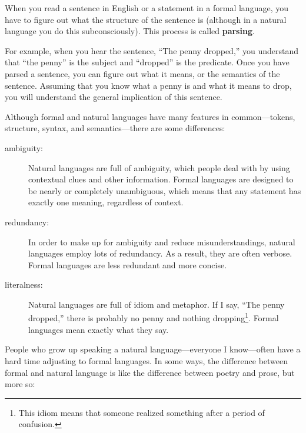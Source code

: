 \documentclass[10pt]{book}
\begin{document}
When you read a sentence in English or a statement in a formal language, you have to figure out what the structure of the sentence is (although in a natural language you do this subconsciously).  This process is called {\bf parsing}.


For example, when you hear the sentence, ``The penny dropped,'' you understand that ``the penny'' is the subject and ``dropped'' is the predicate.  Once you have parsed a sentence, you can figure out what it means, or the semantics of the sentence.  Assuming that you know what a penny is and what it means to drop, you will understand the general implication of this sentence.

Although formal and natural languages have many features in common---tokens, structure, syntax, and semantics---there are some differences:


\begin{description}

\item[ambiguity:] Natural languages are full of ambiguity, which people deal with by using contextual clues and other information. Formal languages are designed to be nearly or completely unambiguous, which means that any statement has exactly one meaning, regardless of context.

\item[redundancy:] In order to make up for ambiguity and reduce misunderstandings, natural languages employ lots of redundancy.  As a result, they are often verbose.  Formal languages are less redundant and more concise.

\item[literalness:] Natural languages are full of idiom and metaphor. If I say, ``The penny dropped,'' there is probably no penny and nothing dropping\footnote{This idiom means that someone realized something after a period of confusion.}.  Formal languages mean exactly what they say.

\end{description}

People who grow up speaking a natural language---everyone I know---often have a hard time adjusting to formal languages.  In some ways, the difference between formal and natural language is like the difference between poetry and prose, but more so:

\end{document}
